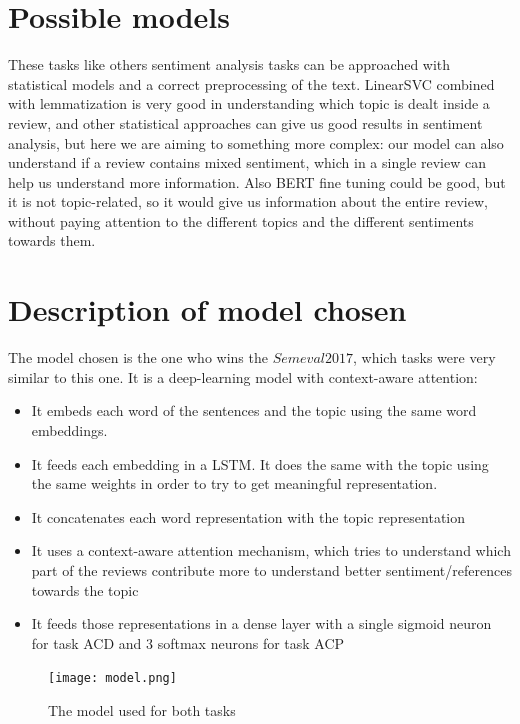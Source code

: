 \documentclass{article}
\begin{document}
    \section{Possible models}\label{sec:s2}
        These tasks like others sentiment analysis tasks can be approached with statistical models and a correct preprocessing of the text.
        LinearSVC combined with lemmatization is very good in understanding which topic is dealt inside a review, and other statistical approaches can give us good results in sentiment analysis, but here we are aiming to something more complex: our model can also understand if a review contains mixed sentiment, which in a single review can help us understand more information.
        Also BERT fine tuning could be good, but it is not topic-related, so it would give us information about the entire review, without paying attention to the different topics and the different sentiments towards them.

    \section{Description of model chosen}\label{sec:s3}
        The model chosen is the one who wins the $Semeval2017$, which tasks were very similar to this one.
        It is a deep-learning model with context-aware attention:
        \begin{itemize}
            \item It embeds each word of the sentences and the topic using the same word embeddings.
            \item It feeds each embedding in a LSTM. It does the same with the topic using the same weights in order to try to get meaningful representation.
            \item It concatenates each word representation with the topic representation
            \item It uses a context-aware attention mechanism, which tries to understand which part of the reviews contribute more to understand better sentiment/references towards the topic
            \item It feeds those representations in a dense layer with a single sigmoid neuron for task ACD and 3 softmax neurons for task ACP
        \end{itemize}
        \begin{figure}
            \texttt{[image: model.png]}
            \caption{The model used for both tasks}
            \label{fig:model}
        \end{figure}
\end{document}

